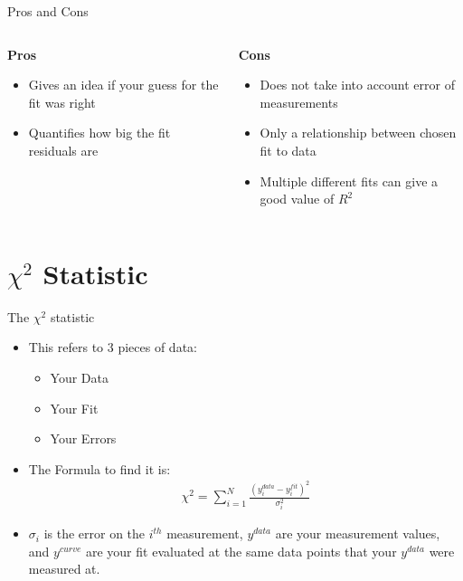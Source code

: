 \documentclass{beamer}
\begin{document}
\begin{frame}{Pros and Cons}
  \begin{columns}
    \begin{column}{0.5\textwidth}
      \textbf{Pros}
      \begin{itemize}
      \item Gives an idea if your guess for the fit was right
      \item Quantifies how big the fit residuals are
      \end{itemize}
    \end{column}
    \begin{column}{0.5\textwidth}
      \textbf{Cons}
      \begin{itemize}
      \item Does not take into account error of measurements
      \item Only a relationship between chosen fit to data
      \item Multiple different fits can give a good value of $R^2$
      \end{itemize}
    \end{column}
  \end{columns}
\end{frame}

\section{$\chi^2$ Statistic}
\begin{frame}{The $\chi^2$ statistic}
  \begin{itemize}
  \item This refers to 3 pieces of data:
    \begin{itemize}
    \item Your Data
    \item Your Fit
    \item Your Errors
    \end{itemize}
  \item The Formula to find it is:
    \begin{align*}
      \chi^2=\sum_{i=1}^N\frac{(y_i^{data}-y_i^{fit})^2}{\sigma_i^2}
    \end{align*}
  \item $\sigma_i$ is the error on the $i^{th}$ measurement, $y^{data}$ are your measurement values, and $y^{curve}$ are your fit evaluated at the same data points that your $y^{data}$ were measured at. 
  \end{itemize}
\end{frame}
\end{document}
